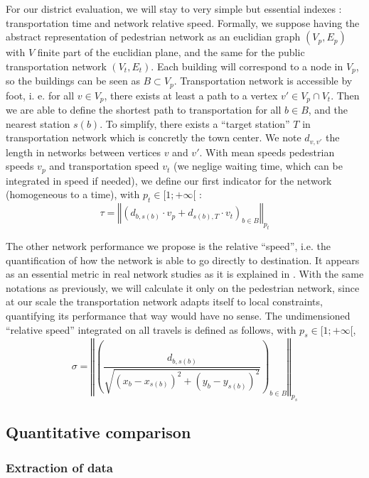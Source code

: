 \documentclass[english]{article}
\begin{document}
For our district evaluation, we will stay to very simple but essential
indexes : transportation time and network relative speed. Formally,
we suppose having the abstract representation of pedestrian network
as an euclidian graph $(V_{p},E_{p})$ with $V$ finite part of the
euclidian plane, and the same for the public transportation network
$(V_{t},E_{t})$. Each building will correspond to a node in $V_{p}$,
so the buildings can be seen as $B\subset V_{p}$. Transportation
network is accessible by foot, i. e. for all $v\in V_{p}$, there
exists at least a path to a vertex $v'\in V_{p}\cap V_{t}$. Then
we are able to define the shortest path to transportation for all
$b\in B$, and the nearest station $s(b)$. To simplify, there exists
a ``target station'' $T$ in transportation network which is concretly
the town center. We note $d_{v,v'}$ the length in networks between
vertices $v$ and $v'$. With mean speeds pedestrian speeds $v_{p}$
and transportation speed $v_{t}$ (we neglige waiting time, which
can be integrated in speed if needed), we define our first indicator
for the network (homogeneous to a time), with $p_{t}\in[1;+\infty[$
:
\[
\tau=\left\Vert \left(d_{b,s(b)}\cdot v_{p}+d_{s(b),T}\cdot v_{t}\right)_{b\in B}\right\Vert _{p_{t}}
\]


The other network performance we propose is the relative ``speed'',
i.e. the quantification of how the network is able to go directly
to destination. It appears as an essential metric in real network
studies as it is explained in \cite{banos2012towards}. With the same
notations as previously, we will calculate it only on the pedestrian
network, since at our scale the transportation network adapts itself
to local constraints, quantifying its performance that way would have
no sense. The undimensioned ``relative speed'' integrated on all
travels is defined as follows, with $p_{s}\in[1;+\infty[$,
\[
\sigma=\left\Vert \left(\frac{d_{b,s(b)}}{\sqrt{(x_{b}-x_{s(b)})^{2}+(y_{b}-y_{s(b)})^{2}}}\right)_{b\in B}\right\Vert _{p_{s}}
\]



\subsection{Quantitative comparison}


\subsubsection{Extraction of data}
\end{document}
